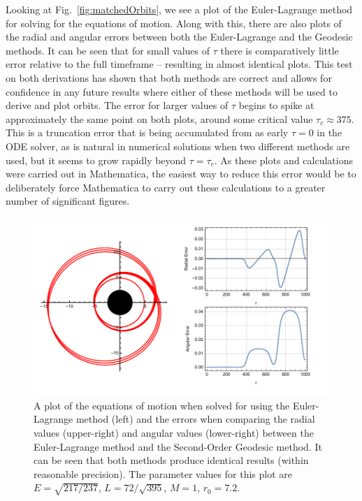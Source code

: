 Looking at Fig.~\eqref{fig:matchedOrbits}, we see a plot of the Euler-Lagrange method for solving for the equations of motion.
Along with this, there are also plots of the radial and angular errors between both the Euler-Lagrange and the Geodesic methods.
It can be seen that for small values of $\tau$ there is comparatively little error relative to the full timeframe -- resulting in almost identical plots.
This test on both derivations has shown that both methods are correct and allows for confidence in any future results where either of these methods will be used to derive and plot orbits.
The error for larger values of $\tau$ begins to spike at approximately the same point on both plots, around some critical value $\tau_c\approx 375$.
This is a truncation error that is being accumulated from as early $\tau=0$ in the ODE solver, as is natural in numerical solutions when two different methods are used, but it seems to grow rapidly beyond $\tau=\tau_c$.
As these plots and calculations were carried out in Mathematica, the easiest way to reduce this error would be to deliberately force Mathematica to carry out these calculations to a greater number of significant figures.

\begin{figure}[!ht]
    \centering
    \includegraphics[width=\textwidth]{images/MatchedOrbits.pdf}
    \caption[Matched orbits: Euler-Lagrange and Geodesic Equations]{A plot of the equations of motion when solved for using the Euler-Lagrange method (left) and the errors when comparing the radial values (upper-right) and angular values (lower-right) between the Euler-Lagrange method and the Second-Order Geodesic method. It can be seen that both methods produce identical results (within reasonable precision). The parameter values for this plot are $E=\sqrt{217/237}$, $L=72/\sqrt{395}$, $M=1$, $r_0=7.2$.}
    \label{fig:matchedOrbits}
\end{figure}

